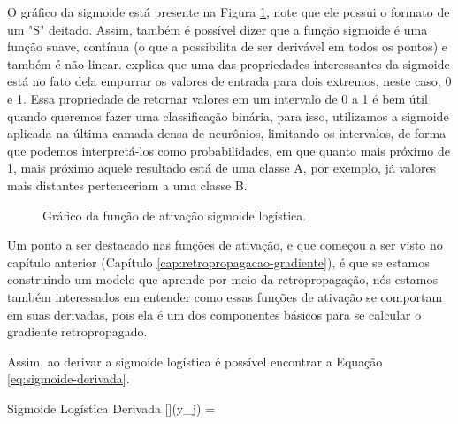O gráfico da sigmoide está presente na Figura \ref{fig:sigmoide}, note que ele possui o formato de um "S" deitado. Assim, também é possível dizer que a função sigmoide é uma função suave, contínua (o que a possibilita de ser derivável em todos os pontos) e também é não-linear. \textcite{ActivationFunctionsLederer} explica que uma das propriedades interessantes da sigmoide está no fato dela empurrar os valores de entrada para dois extremos, neste caso, 0 e 1. Essa propriedade de retornar valores em um intervalo de 0 a 1 é bem útil quando queremos fazer uma classificação binária, para isso, utilizamos a sigmoide aplicada na última camada densa de neurônios, limitando os intervalos, de forma que podemos interpretá-los como probabilidades, em que quanto mais próximo de 1, mais próximo aquele resultado está de uma classe A, por exemplo, já valores mais distantes pertenceriam a uma classe B.

\begin{figure}[h!]
    \centering
    \caption{Gráfico da função de ativação sigmoide logística.}
    \label{fig:sigmoide}
\end{figure}

Um ponto a ser destacado nas funções de ativação, e que começou a ser visto no capítulo anterior (Capítulo \ref{cap:retropropagacao-gradiente}), é que se estamos construindo um modelo que aprende por meio da retropropagação, nós estamos também interessados em entender como essas funções de ativação se comportam em suas derivadas, pois ela é um dos componentes básicos para se calcular o gradiente retropropagado.

Assim, ao derivar a sigmoide logística é possível encontrar a Equação \ref{eq:sigmoide-derivada}.

\begin{equacaodestaque}{Sigmoide Logística Derivada}
    [\sigma](y_j) = 
    \label{eq:sigmoide-derivada}
\end{equacaodestaque}

